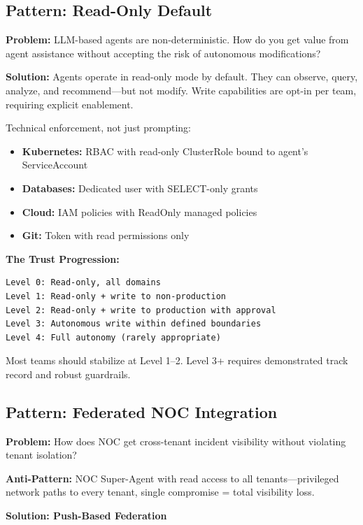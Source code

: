 \subsection{Pattern: Read-Only Default}
\label{subsec:readonly-default}

\textbf{Problem:} LLM-based agents are non-deterministic. How do you get value from agent assistance without accepting the risk of autonomous modifications?

\textbf{Solution:} Agents operate in read-only mode by default. They can observe, query, analyze, and recommend---but not modify. Write capabilities are opt-in per team, requiring explicit enablement.

Technical enforcement, not just prompting:
\begin{itemize}
    \item \textbf{Kubernetes:} RBAC with read-only ClusterRole bound to agent's ServiceAccount
    \item \textbf{Databases:} Dedicated user with SELECT-only grants
    \item \textbf{Cloud:} IAM policies with ReadOnly managed policies
    \item \textbf{Git:} Token with read permissions only
\end{itemize}

\textbf{The Trust Progression:}
\begin{lstlisting}[caption={Trust Progression Levels}]
Level 0: Read-only, all domains
Level 1: Read-only + write to non-production
Level 2: Read-only + write to production with approval
Level 3: Autonomous write within defined boundaries
Level 4: Full autonomy (rarely appropriate)
\end{lstlisting}

Most teams should stabilize at Level 1--2. Level 3+ requires demonstrated track record and robust guardrails.

\subsection{Pattern: Federated NOC Integration}
\label{subsec:federated-noc}

\textbf{Problem:} How does NOC get cross-tenant incident visibility without violating tenant isolation?

\textbf{Anti-Pattern:} NOC Super-Agent with read access to all tenants---privileged network paths to every tenant, single compromise = total visibility loss.

\textbf{Solution: Push-Based Federation}

